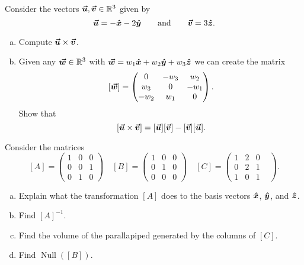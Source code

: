 \documentclass[12pt]{amsbook}
\newcommand{\R}{\mathbb{R}}
\begin{document}
\newpage
\begin{problem}
Consider the vectors $\vecu, \vecv \in \R^3$ given by
\[
\boldsymbol{\boldsymbol{\vec{u}}} = -\boldsymbol{\hat{x}} - 2\boldsymbol{\hat{y}} \qquad \textrm{and} \qquad \boldsymbol{\boldsymbol{\vec{v}}} = 3\boldsymbol{\hat{z}}.
\]
\begin{enumerate}[(a)]
    \item Compute $\boldsymbol{\boldsymbol{\vec{u}}} \times \boldsymbol{\boldsymbol{\vec{v}}}$.
    \item Given any $\vecw \in \R^3$ with $\boldsymbol{\boldsymbol{\vec{w}}} = w_1 \boldsymbol{\hat{x}} + w_2 \boldsymbol{\hat{y}} + w_3\boldsymbol{\hat{z}}$ we can create the matrix
    \[
    [\boldsymbol{\boldsymbol{\vec{w}}}] = \begin{pmatrix} 0 & -w_3 & w_2 \\ w_3 & 0 & -w_1 \\ -w_2 & w_1 & 0 \end{pmatrix}.
    \]
    Show that 
    \[
    [\boldsymbol{\boldsymbol{\vec{u}}} \times \boldsymbol{\boldsymbol{\vec{v}}}] = [\boldsymbol{\boldsymbol{\vec{u}}}][\boldsymbol{\boldsymbol{\vec{v}}}]-[\boldsymbol{\boldsymbol{\vec{v}}}][\boldsymbol{\boldsymbol{\vec{u}}}].
    \]
\end{enumerate}

\end{problem}


\newpage
\begin{problem}
Consider the matrices
\[
[A] = \begin{pmatrix} 1 & 0 & 0 \\ 0 & 0 & 1 \\ 0 & 1 & 0 \end{pmatrix} \quad [B] = \begin{pmatrix} 1 & 0 & 0 \\ 0 & 1 & 0 \\ 0 & 0 & 0 \end{pmatrix} \quad [C] = \begin{pmatrix} 1 & 2 & 0 \\ 0 & 2 & 1 & \\ 1 & 0 & 1 \end{pmatrix}.
\]
\begin{enumerate}[(a)]
    \item Explain what the transformation $[A]$ does to the basis vectors $\boldsymbol{\hat{x}}$, $\boldsymbol{\hat{y}}$, and $\boldsymbol{\hat{z}}$.
    \item Find $[A]^{-1}$.
    \item Find the volume of the parallapiped generated by the columns of $[C]$.
    \item Find $\operatorname{Null}([B])$.
\end{enumerate}
\end{problem}
\end{document}
